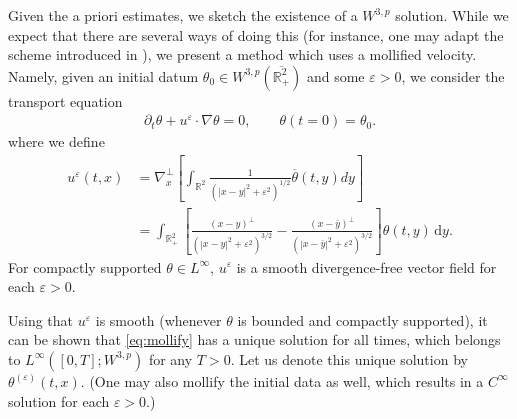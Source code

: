 \documentclass[10pt]{amsart}
\theoremstyle{definition}
\theoremstyle{remark}
\numberwithin{equation}{section}
\newcommand{\ud}{\mathrm{d}}
\newcommand{\rd}{\partial}
\newcommand{\nb}{\nabla}
\newcommand{\0}{\emptyset}
\newcommand{\ohp}{\overline{\bbR^2_+}}
\newcommand{\tht}{\theta}
\newcommand{\bbR}{\mathbb R}
\newcommand{\varep}{\varepsilon}
\begin{document}
        Given the a priori estimates, we sketch the existence of a $W^{3,p}$ solution. While we expect that there are several ways of doing this (for instance, one may adapt the scheme introduced in \cite{CNgu2}), we present a method which uses a mollified velocity. Namely, given an initial datum $\tht_{0} \in W^{3,p}(\ohp)$ and some $\varepsilon>0$, we consider the transport equation \begin{equation}\label{eq:mollify}
        	\begin{split}
        		\rd_t \tht + u^{\varepsilon}\cdot\nb \tht = 0, \qquad \tht(t=0) = \tht_{0}. 
        	\end{split}
        \end{equation} where we define \begin{equation}\label{eq:u-eps}
        	\begin{split}
        		u^{\varepsilon}(t,x) & = \nb^\perp_{x}\left[ \int_{\bbR^2} \frac1{ (|x-y|^2 + \varep^2)^{1/2} } \overline{\tht}(t,y) dy \right] \\
        		&=  \int_{ \bbR^2_+ } \left[ \frac{(x-y)^\perp}{(|x-y|^2+\varep^2)^{3/2}} - \frac{(x-\bar{y})^\perp}{(|x-\bar{y}|^2+\varep^2)^{3/2}}   \right] \tht(t,y) \, \ud y. 
        	\end{split}
        \end{equation}
        For compactly supported $\tht \in L^{\infty}$, $u^\varep$ is a smooth divergence-free vector field for each $\varep>0$. 
        
        Using that $u^\varep$ is smooth (whenever $\tht$ is bounded and compactly supported), it can be shown that \eqref{eq:mollify} has a unique solution for all times, which belongs to $L^{\infty}([0,T];W^{3,p})$ for any $T>0$. Let us denote this unique solution by $\tht^{(\varep)}(t,x)$. (One may also mollify the initial data as well, which results in a $C^{\infty}$ solution for each $\varep>0$.) 
        
\end{document}

